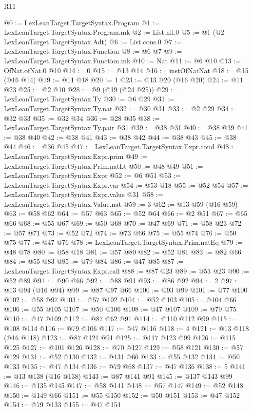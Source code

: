 \begin{lexlean}{R11}
\begin{coremodule}
@0 := LexLeanTarget.TargetSyntax.Program
@1 := LexLeanTarget.TargetSyntax.Program.mk
@2 := List.nil.{0}
@5 := @1 (@2 LexLeanTarget.TargetSyntax.Adt)
@6 := List.cons.{0}
@7 := LexLeanTarget.TargetSyntax.Function
@8 := @6 @7
@9 := LexLeanTarget.TargetSyntax.Function.mk
@10 := Nat
@11 := @6 @10
@13 := OfNat.ofNat.{0} @10
@14 := 0
@15 := @13 @14
@16 := instOfNatNat
@18 := @15 (@16 @14)
@19 := @11 @18
@20 := 1
@23 := @13 @20 (@16 @20)
@24 := @11 @23
@25 := @2 @10
@28 := @9 (@19 (@24 @25))
@29 := LexLeanTarget.TargetSyntax.Ty
@30 := @6 @29
@31 := LexLeanTarget.TargetSyntax.Ty.nat
@32 := @30 @31
@33 := @2 @29
@34 := @32 @33
@35 := @32 @34
@36 := @28 @35
@38 := LexLeanTarget.TargetSyntax.Ty.pair @31
@39 := @38 @31
@40 := @38 @39
@41 := @38 @40
@42 := @38 @41
@43 := @38 @42
@44 := @38 @43
@45 := @38 @44
@46 := @36 @45
@47 := LexLeanTarget.TargetSyntax.Expr.cond
@48 := LexLeanTarget.TargetSyntax.Expr.prim
@49 := LexLeanTarget.TargetSyntax.Prim.natLt
@50 := @48 @49
@51 := LexLeanTarget.TargetSyntax.Expr
@52 := @6 @51
@53 := LexLeanTarget.TargetSyntax.Expr.var
@54 := @53 @18
@55 := @52 @54
@57 := LexLeanTarget.TargetSyntax.Expr.value @31
@58 := LexLeanTarget.TargetSyntax.Value.nat
@59 := 3
@62 := @13 @59 (@16 @59)
@63 := @58 @62
@64 := @57 @63
@65 := @52 @64
@66 := @2 @51
@67 := @65 @66
@68 := @55 @67
@69 := @50 @68
@70 := @47 @69
@71 := @58 @23
@72 := @57 @71
@73 := @52 @72
@74 := @73 @66
@75 := @55 @74
@76 := @50 @75
@77 := @47 @76
@78 := LexLeanTarget.TargetSyntax.Prim.natEq
@79 := @48 @78
@80 := @58 @18
@81 := @57 @80
@82 := @52 @81
@83 := @82 @66
@84 := @55 @83
@85 := @79 @84
@86 := @47 @85
@87 := LexLeanTarget.TargetSyntax.Expr.call
@88 := @87 @23
@89 := @53 @23
@90 := @52 @89
@91 := @90 @66
@92 := @88 @91
@93 := @86 @92
@94 := 2
@97 := @13 @94 (@16 @94)
@99 := @87 @97 @66
@100 := @93 @99
@101 := @77 @100
@102 := @58 @97
@103 := @57 @102
@104 := @52 @103
@105 := @104 @66
@106 := @55 @105
@107 := @50 @106
@108 := @47 @107
@109 := @79 @75
@110 := @47 @109
@112 := @87 @62 @91
@114 := @110 @112 @99
@115 := @108 @114
@116 := @79 @106
@117 := @47 @116
@118 := 4
@121 := @13 @118 (@16 @118)
@123 := @87 @121 @91
@125 := @117 @123 @99
@126 := @115 @125
@127 := @101 @126
@128 := @70 @127
@129 := @58 @121
@130 := @57 @129
@131 := @52 @130
@132 := @131 @66
@133 := @55 @132
@134 := @50 @133
@135 := @47 @134
@136 := @79 @68
@137 := @47 @136
@138 := 5
@141 := @13 @138 (@16 @138)
@143 := @87 @141 @91
@145 := @137 @143 @99
@146 := @135 @145
@147 := @58 @141
@148 := @57 @147
@149 := @52 @148
@150 := @149 @66
@151 := @55 @150
@152 := @50 @151
@153 := @47 @152
@154 := @79 @133
@155 := @47 @154

\end{coremodule}
\end{lexlean}
